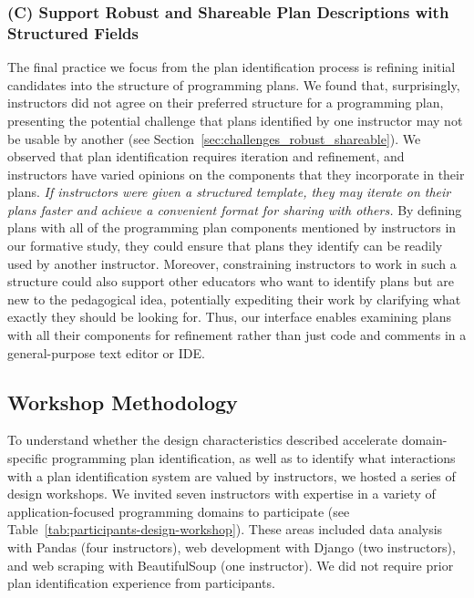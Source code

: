 \subsubsection*{(C) Support \textbf{Robust and Shareable Plan Descriptions} with \textbf{Structured Fields}}
The final practice we focus from the plan identification process is refining initial candidates into the structure of programming plans. 
We found that, surprisingly, instructors did not agree on their preferred structure for a programming plan, presenting the potential challenge that plans identified by one instructor may not be usable by another (see Section~\ref{sec:challenges_robust_shareable}). We observed that plan identification requires iteration and refinement, and instructors have varied opinions on the components that they incorporate in their plans.
\textit{If instructors were given a structured template, they may iterate on their plans faster and achieve a convenient format for sharing with others.} By defining plans with all of the programming plan components mentioned by instructors in our formative study, they could ensure that plans they identify can be readily used by another instructor. Moreover, constraining instructors to work in such a structure could also support other educators who want to identify plans but are new to the pedagogical idea, potentially expediting their work by clarifying what exactly they should be looking for.
Thus, our interface enables examining plans with all their components for refinement rather than just code and comments in a general-purpose text editor or IDE.


\subsection{Workshop Methodology}

To understand whether the design characteristics described accelerate domain-specific programming plan identification, as well as to identify what interactions with a plan identification system are valued by instructors, we hosted a series of design workshops.
We invited seven instructors with expertise in a variety of application-focused programming domains to participate (see Table~\ref{tab:participants-design-workshop}).
These areas included data analysis with Pandas (four instructors), web development with Django (two instructors), and web scraping with BeautifulSoup (one instructor). We did not require prior plan identification experience from participants. 



